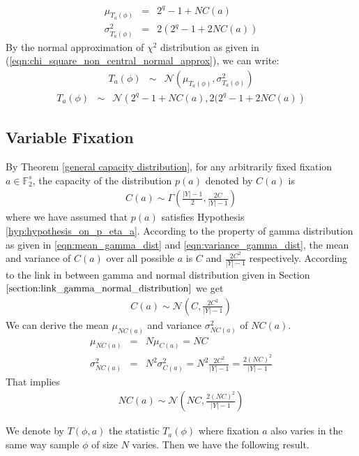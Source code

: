 \begin{eqnarray*}
\mu_{T_{a}(\phi)} &=& 2^q -1 + NC(a)\\
\sigma^2_{T_{a}(\phi)} &=& 2(2^q-1+2NC(a))
\end{eqnarray*}
By the normal approximation of $\chi^2$ distribution as given in (\ref{eqn:chi_square_non_central_normal_approx}), we can write:
\begin{eqnarray*}
T_{a}(\phi) &\sim & \mathcal{N}(\mu_{T_{a}(\phi)},\sigma^2_{T_{a}(\phi)})
\end{eqnarray*}
\begin{eqnarray}
T_{a}(\phi) &\sim & \mathcal{N}\left(2^q -1 + NC(a),2(2^q-1+2NC(a)\right) \label{eqn:distribution_of_T_fixed_a_variable_phi}
\end{eqnarray}
\subsection{Variable Fixation}
By Theorem \ref{general capacity distribution}, for any arbitrarily fixed fixation $a \in \mathbb{F}_2^{s}$, the capacity of the distribution $p(a)$ denoted by $C(a)$ is
\begin{eqnarray*}
C(a) \sim \Gamma\left(\frac{|Y|-1}{2},\frac{2C}{|Y|-1}\right)
\end{eqnarray*} where we have assumed that $p\left(a\right)$ satisfies Hypothesis \ref{hyp:hypothesis_on_p_eta_a}. According to the property of gamma distribution as given in \ref{eqn:mean_gamma_dist} and \ref{eqn:variance_gamma_dist}, the mean and variance of $C\left(a\right)$ over all possible $a$ is $C$ and $\frac{2C^2}{|Y|-1}$ respectively. According to the link in between gamma and normal distribution given in Section $\ref{section:link_gamma_normal_distribution}$ we get
\begin{eqnarray}
C(a) \sim \mathcal{N}\left(C,\frac{2C^2}{|Y|-1}\right) \label{normal distribution C a}
\end{eqnarray} We can derive the mean $\mu_{NC(a)}$ and variance $\sigma^{2}_{NC(a)}$ of $NC(a)$. 
\begin{eqnarray*}
\mu_{NC(a)} &=& N\mu_{C(a)} = NC \\
\sigma^{2}_{NC(a)} &=& N^2\sigma^{2}_{C(a)} = N^2\frac{2C^2}{|Y|-1} = \frac{2(NC)^2}{|Y|-1}
\end{eqnarray*}
That implies
\begin{eqnarray}
NC(a) \sim \mathcal{N}\left(NC,\frac{2(NC)^2}{|Y|-1}\right) \label{Distribution of NC(a)}
\end{eqnarray}
\par \noindent We denote by $T\left(\phi,a \right)$ the statistic $T_a\left(\phi\right)$ where fixation $a$ also varies in the same way sample $\phi$ of size $N$ varies. Then we have the following result.
